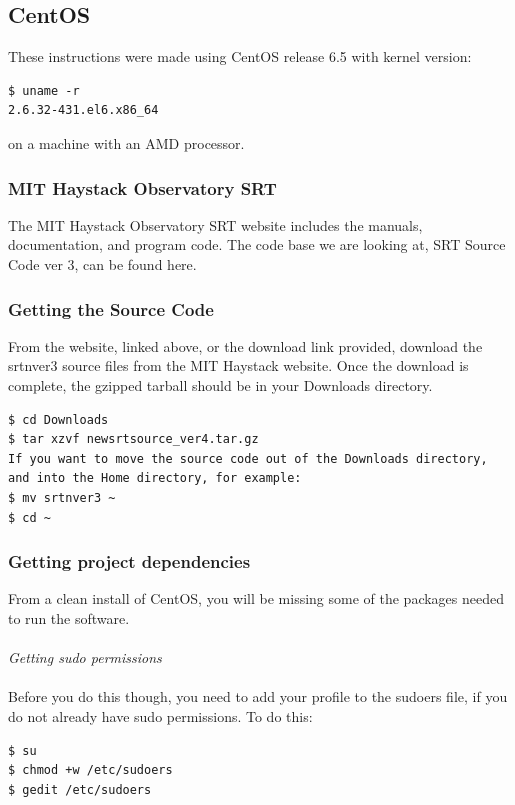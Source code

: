 \documentclass[11pt]{article} %
\begin{document}
\subsection{CentOS}


These instructions were made using CentOS release 6.5 with kernel version:

\begin{verbatim}
$ uname -r
2.6.32-431.el6.x86_64
\end{verbatim}
on a machine with an AMD processor.

\subsubsection{MIT Haystack Observatory SRT}
The MIT Haystack Observatory SRT website includes the manuals, documentation, and program code. The code base we are looking at, SRT Source Code ver 3, can be found here.

\subsubsection{Getting the Source Code}
From the website, linked above, or the download link provided, download the srtnver3 source files from the MIT Haystack website. Once the download is complete, the gzipped tarball should be in your Downloads directory.

\begin{verbatim}
$ cd Downloads
$ tar xzvf newsrtsource_ver4.tar.gz
If you want to move the source code out of the Downloads directory, and into the Home directory, for example:
$ mv srtnver3 ~
$ cd ~
\end{verbatim}

\subsubsection{Getting project dependencies}
From a clean install of CentOS, you will be missing some of the packages needed to run the software.
\\ \\
\emph{Getting sudo permissions} \\ \\
Before you do this though, you need to add your profile to the sudoers file, if you do not already have sudo permissions. To do this:

\begin{verbatim}
$ su
$ chmod +w /etc/sudoers
$ gedit /etc/sudoers
\end{verbatim}
\end{document}
